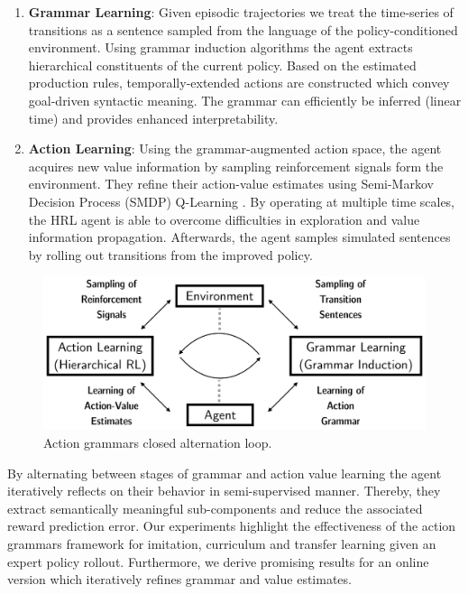 \documentclass[10pt,letterpaper]{article}
\begin{document}
\begin{enumerate}
	\item \textbf{Grammar Learning}: Given episodic trajectories we treat the time-series of transitions as a sentence sampled from the language of the policy-conditioned environment. Using grammar induction algorithms \cite{Manning_1997} the agent extracts hierarchical constituents of the current policy. Based on the estimated production rules, temporally-extended actions are constructed which convey goal-driven syntactic meaning. The grammar can efficiently be inferred (linear time) and provides enhanced interpretability.
	\item \textbf{Action Learning}: Using the grammar-augmented action space, the agent acquires new value information by sampling reinforcement signals form the environment. They refine their action-value estimates using Semi-Markov Decision Process (SMDP) Q-Learning \cite{Bradtke_1995}. By operating at multiple time scales, the HRL agent is able to overcome difficulties in exploration and value information propagation. Afterwards, the agent samples simulated sentences by rolling out transitions from the improved policy.
\end{enumerate}

\begin{figure}
    \centering
    \includegraphics[width=\linewidth]{figures/concept_al_gl.png}
    \caption{Action grammars closed alternation loop.}
    \label{fig:loop_ag}
\end{figure}

By alternating between stages of grammar and action value learning the agent iteratively reflects on their behavior in semi-supervised manner. Thereby, they extract semantically meaningful sub-components and reduce the associated reward prediction error.
Our experiments highlight the effectiveness of the action grammars framework for imitation, curriculum and transfer learning given an expert policy rollout. Furthermore, we derive promising results for an online version which iteratively refines grammar and value estimates. 
\end{document}
